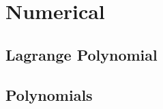 \section{Numerical}
\subsection{Lagrange Polynomial}
\vspace{-2ex}
\raggedbottom
\vspace{-3.2ex}
\hrulefill
\subsection{Polynomials}
\vspace{-2ex}
\raggedbottom
\vspace{-3.2ex}
\hrulefill

